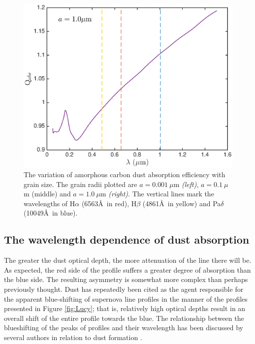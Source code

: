 \documentclass[useAMS,usenatbib,usegraphicx]{mnras}
\begin{document}
\begin{figure}
\includegraphics[trim =20 0 5 0,clip=true,scale=0.33]{Qabs_a1_0}
\caption{The variation of amorphous carbon dust absorption efficiency with grain size. The grain radii plotted are $a=0.001~\mu$m \textit{(left)}, $a=0.1~\mu$m (middle) and $a=1.0~\mu$m \textit{(right)}.  The vertical lines mark the wavelengths of H$\alpha$ (6563\AA\ in red), H$\beta$ (4861\AA\ in yellow) and Pa$\delta$ (10049\AA\ in blue).}
\label{wav_dep2}
\end{figure}






\subsection{The wavelength dependence of dust absorption}
\label{asym}

The greater the dust optical depth, the more attenuation of the line 
there will be.  As expected, the red side of the profile suffers a greater 
degree of absorption than the blue side.  The resulting asymmetry is 
somewhat more complex than perhaps previously thought.  Dust has 
repeatedly been cited as the agent responsible for the apparent 
blue-shifting of supernova line profiles in the manner of the profiles 
presented in Figure \ref{fig:Lucy}; that is, relatively high optical 
depths result in an overall shift of the entire profile towards the blue.
 The relationship between the blueshifting of the peaks 
of profiles and their wavelength has been discussed by several authors in 
relation to dust formation \citep{Smith2012, Fransson2014, Gall2014}.  
  
\end{document}
